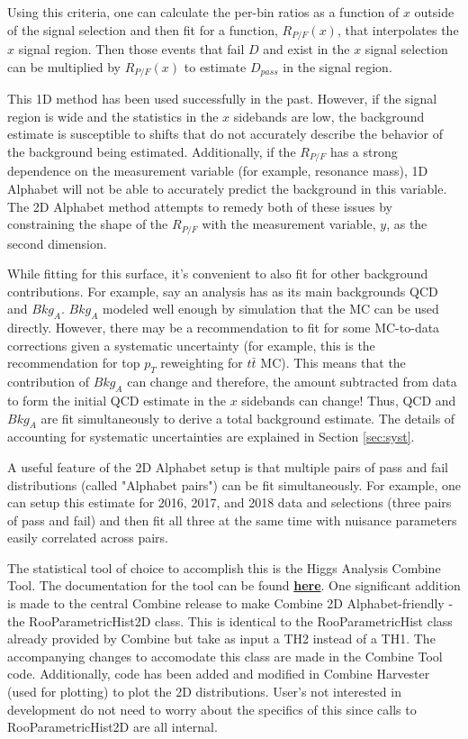 \documentclass[letter]{article}
\begin{document}
    Using this criteria, one can calculate the per-bin ratios as a function of $x$ outside of the signal selection and then fit for a function, $R_{P/F}(x)$, that interpolates the $x$ signal region. Then those events that fail $D$ and exist in the $x$ signal selection can be multiplied by $R_{P/F}(x)$ to estimate $D_{pass}$ in the signal region.

    This 1D method has been used successfully in the past. However, if the signal region is wide and the statistics in the $x$ sidebands are low, the background estimate is susceptible to shifts that do not accurately describe the behavior of the background being estimated. Additionally, if the $R_{P/F}$ has a strong dependence on the measurement variable (for example, resonance mass), 1D Alphabet will not be able to accurately predict the background in this variable. The 2D Alphabet method attempts to remedy both of these issues by constraining the shape of the $R_{P/F}$ with the measurement variable, $y$, as the second dimension. 

    While fitting for this surface, it's convenient to also fit for other background contributions. For example, say an analysis has as its main backgrounds QCD and $Bkg_A$. $Bkg_A$ modeled well enough by simulation that the MC can be used directly. However, there may be a recommendation to fit for some MC-to-data corrections given a systematic uncertainty (for example, this is the recommendation for top $p_{T}$ reweighting for $t\bar{t}$ MC). This means that the contribution of $Bkg_A$ can change and therefore, the amount subtracted from data to form the initial QCD estimate in the $x$ sidebands can change! Thus, QCD and $Bkg_A$ are fit simultaneously to derive a total background estimate. The details of accounting for systematic uncertainties are explained in Section \ref{sec:syst}.

    A useful feature of the 2D Alphabet setup is that multiple pairs of pass and fail distributions (called "Alphabet pairs") can be fit simultaneously. For example, one can setup this estimate for 2016, 2017, and 2018 data and selections (three pairs of pass and fail) and then fit all three at the same time with nuisance parameters easily correlated across pairs. 

    The statistical tool of choice to accomplish this is the Higgs Analysis Combine Tool. The documentation for the tool can be found \href{https://cms-hcomb.gitbooks.io/combine/content/}{\textbf{here}}. One significant addition is made to the central Combine release to make Combine 2D Alphabet-friendly - the RooParametricHist2D class. This is identical to the RooParametricHist class already provided by Combine but take as input a TH2 instead of a TH1. The accompanying changes to accomodate this class are made in the Combine Tool code. Additionally, code has been added and modified in Combine Harvester (used for plotting) to plot the 2D distributions. User's not interested in development do not need to worry about the specifics of this since calls to RooParametricHist2D are all internal. 
\end{document}

